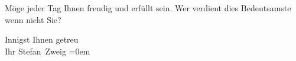 \pstart
           Möge jeder Tag Ihnen freudig und erfüllt sein. Wer verdient dies
               Bedeutsamste wenn nicht Sie? \pend
           
\pstart
           Innigst Ihnen getreu{\\[\baselineskip]}Ihr \spacefill\mbox{Stefan Zweig}\pend
           \leftskip=0em{}\endnumbering{}
\begin{anhang}
\end{anhang}
      